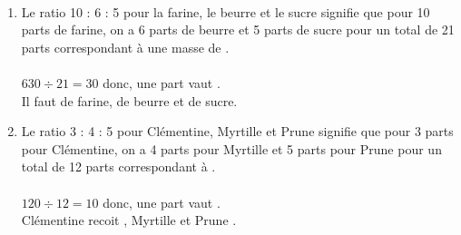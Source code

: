 \ \\ [-5mm]
   \begin{enumerate}
      \item Le ratio 10 : 6 : 5 pour la farine, le beurre et le sucre signifie que pour 10 parts de farine, on a 6 parts de beurre et 5 parts de sucre pour un total de 21 parts correspondant à une masse de . \\ [2mm]
           \quad  {} \\
         $630\div21 =30$ donc, une part vaut . \\
         Il faut {\blue {} de farine,  de beurre et  de sucre.}
      \item Le ratio 3 : 4 : 5 pour Clémentine, Myrtille et Prune signifie que pour 3 parts pour Clémentine, on a 4 parts pour Myrtille et 5 parts pour Prune pour un total de 12 parts correspondant à . \\ [2mm]
           \quad  {} \\
         $120\div12 =10$ donc, une part vaut . \\
         {\blue Clémentine recoit , Myrtille  et Prune .}
   \end{enumerate}
